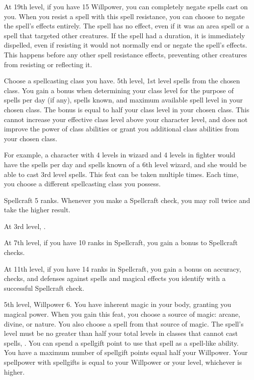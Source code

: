     At 19th level, if you have 15 Willpower, you can completely negate spells cast on you.
    When you resist a spell with this spell resistance, you can choose to negate the spell's effects entirely.
    The spell has no effect, even if it was an area spell or a spell that targeted other creatures.
    If the spell had a duration, it is immediately dispelled, even if resisting it would not normally end or negate the spell's effects.
    This happens before any other spell resistance effects, preventing other creatures from resisting or reflecting it.

    Choose a spellcasting class you have.
    \featpres 5th level, 1st level spells from the chosen class.
    \featben You gain a bonus when determining your class level for the purpose of spells per day (if any), spells known, and maximum available spell level in your chosen class.
    The bonus is equal to half your class level in your chosen class.
    This cannot increase your effective class level above your character level, and does not improve the power of class abilities or grant you additional class abilities from your chosen class.

    For example, a character with 4 levels in wizard and 4 levels in fighter would have the spells per day and spells known of a 6th level wizard, and she would be able to cast 3rd level spells.
     This feat can be taken multiple times.
    Each time, you choose a different spellcasting class you possess.

    \featpre Spellcraft 5 ranks.
    \featben Whenever you make a Spellcraft check, you may roll twice and take the higher result.

    At 3rd level, \tdash.

    At 7th level, if you have 10 ranks in Spellcraft, you gain a  bonus to Spellcraft checks.

    At 11th level, if you have 14 ranks in Spellcraft, you gain a  bonus on accuracy, checks, and defenses against spells and magical effects you identify with a successful Spellcraft check.

    \featpres 5th level, Willpower 6.
    \featben You have inherent magic in your body, granting you magical power.
    When you gain this feat, you choose a source of magic: arcane, divine, or nature.
    You also choose a spell from that source of magic.
    The spell's level must be no greater than half your total levels in classes that cannot cast spells, .
    You can spend a spellgift point to use that spell as a spell-like ability.
    You have a maximum number of spellgift points equal half your Willpower.
    Your spellpower with spellgifts is equal to your Willpower or your level, whichever is higher.

